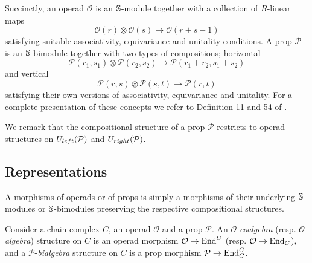 Succinctly, an operad $\mathcal O$ is an $\S$-module together with a collection of $R$-linear maps
\begin{equation*}
\mathcal O(r) \otimes \mathcal O(s) \to \mathcal O(r+s-1)
\end{equation*}
satisfying suitable associativity, equivariance and unitality conditions.
A prop $\mathcal P$ is an $\S$-bimodule together with two types of compositions; horizontal
\begin{equation*}
\mathcal P(r_1, s_1) \otimes \mathcal P(r_2, s_2) \to \mathcal P(r_1 + r_2, s_1 + s_2)
\end{equation*}
and vertical
\begin{equation*}
\mathcal P(r,s) \otimes \mathcal P(s, t) \to \mathcal P(r, t)
\end{equation*}
satisfying their own versions of associativity, equivariance and unitality.
For a complete presentation of these concepts we refer to Definition 11 and 54 of \cite{Markl08}.

We remark that the compositional structure of a prop $\mathcal P$ restricts to operad structures on $\Uleft(\mathcal P)$ and $\Uright(\mathcal P)$.

%

\subsection{Representations}

A morphisms of operads or of props is simply a morphisms of their underlying $\S$-modules or $\S$-bimodules preserving the respective compositional structures.

Consider a chain complex $C$, an operad $\mathcal O$ and a prop $\mathcal P$. An $\mathcal O$-\textit{coalgebra} (resp. $\mathcal O$-\textit{algebra}) structure on $C$ is an operad morphism $\mathcal O \to \End^C$ (resp. $\mathcal O \to \End_C$), and a $\mathcal P$-\textit{bialgebra} structure on $C$ is a prop morphism $\mathcal P \to \End_C^C$.


